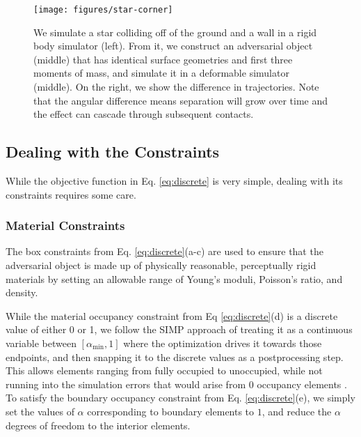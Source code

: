 \begin{figure*}[t]
 \centering
 \texttt{[image: figures/star-corner]}
 \vspace{-0.7cm}
 \caption{We simulate a star colliding off of the ground and a wall in a rigid body simulator (left). From it, we construct an adversarial object (middle) that has identical surface geometries and first three moments of mass, and simulate it in a deformable simulator (middle). On the right, we show the difference in trajectories. Note that the angular difference means separation will grow over time and the effect can cascade through subsequent contacts.} 
 \label{fig:base-example}
\end{figure*}

\subsection{Dealing with the Constraints}
While the objective function in Eq. \ref{eq:discrete} is very simple, dealing with its constraints requires some care.

\subsubsection{Material Constraints}
The box constraints from Eq. \ref{eq:discrete}(a-c) are used to ensure that the adversarial object is made up of physically reasonable, perceptually rigid materials by setting an allowable range of Young's moduli, Poisson's ratio, and density.

While the material occupancy constraint from Eq \ref{eq:discrete}(d) is a discrete value of either 0 or 1, we follow the SIMP approach of treating it as a continuous variable between $[\alpha_\text{min}, 1]$ where the optimization drives it towards those endpoints, and then snapping it to the discrete values as a postprocessing step. This allows elements ranging from fully occupied to unoccupied, while not running into the simulation errors that would arise from 0 occupancy elements \cite{Mlejnek1992SomeAO}. To satisfy the boundary occupancy constraint from Eq. \ref{eq:discrete}(e), we simply set the values of $\alpha$ corresponding to boundary elements to $1$, and reduce the $\alpha$ degrees of freedom to the interior elements.

